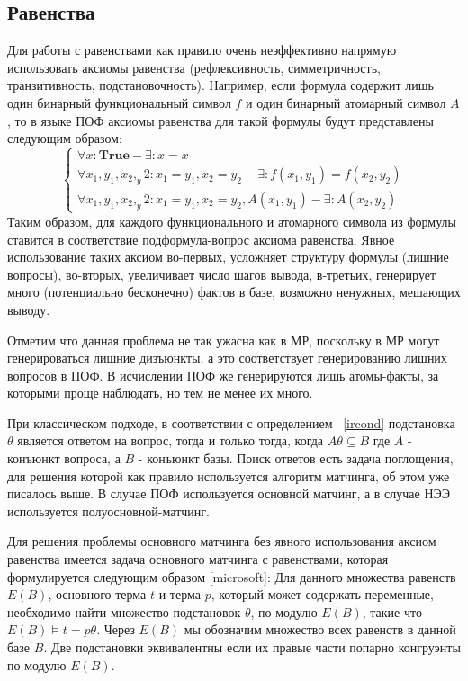 \subsection{Равенства}
Для работы с равенствами как правило очень неэффективно напрямую использовать аксиомы равенства (рефлексивность, симметричность, транзитивность, подстановочность). Например, если формула содержит лишь один бинарный функциональный символ $f$ и один бинарный атомарный символ $A$, то в языке ПОФ аксиомы равенства для такой формулы будут представлены следующим образом:
$$\left\lbrace
\begin{array}{l}
\forall x\colon\boldsymbol{True} - \exists\colon x = x \\
\forall x_1,y_1,x_2,_y2\colon x_1 = y_1, x_2 = y_2 - \exists\colon f(x_1,y_1) = f(x_2, y_2) \\
\forall x_1,y_1,x_2,_y2\colon x_1 = y_1, x_2 = y_2, A(x_1,y_1) - \exists\colon A(x_2,y_2)
\end{array}\right.
$$
Таким образом, для каждого функционального и атомарного символа из формулы ставится в соответствие подформула-вопрос аксиома равенства. Явное использование таких аксиом во-первых, усложняет структуру формулы (лишние вопросы), во-вторых, увеличивает число шагов вывода, в-третьих, генерирует много (потенциально бесконечно) фактов в базе, возможно ненужных, мешающих выводу.

Отметим что данная проблема не так ужасна как в МР, поскольку в МР могут генерироваться лишние дизъюнкты, а это соответствует генерированию лишних вопросов в ПОФ. В исчислении ПОФ же генерируются лишь атомы-факты, за которыми проще наблюдать, но тем не менее их много.

При классическом подходе, в соответствии с определением ~\ref{ircond} подстановка $\theta$ является ответом на вопрос, тогда и только тогда, когда $A \theta \subseteq B$ где $A$ - конъюнкт вопроса, а $B$ - конъюнкт базы. Поиск ответов есть задача поглощения, для решения которой как правило используется алгоритм матчинга, об этом уже писалось выше. В случае ПОФ используется основной матчинг, а в случае НЭЭ используется полуосновной-матчинг.

Для решения проблемы основного матчинга без явного использования аксиом равенства имеется задача основного матчинга с равенствами, которая формулируется следующим образом [microsoft]:
Для данного множества равенств $E(B)$, основного терма $t$ и терма $p$, который может содержать переменные, необходимо найти множество подстановок $\theta$, по модулю $E(B)$, такие что $E(B)\models t = p\theta$. Через $E(B)$ мы обозначим множество всех равенств в данной базе $B$. Две подстановки эквивалентны если их правые части попарно конгруэнты по модулю $E(B)$.

